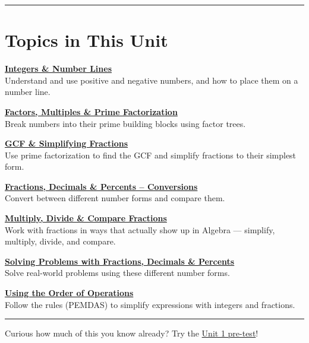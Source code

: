 \documentclass[
  letterpaper,
  DIV=11,
  numbers=noendperiod]{scrreprt}
\begin{document}
\begin{center}\rule{0.5\linewidth}{0.5pt}\end{center}

\section*{Topics in This Unit}\label{topics-in-this-unit}


\href{1.1_Integers_&_Number_Lines.html}{\textbf{Integers \& Number
Lines}}\\
Understand and use positive and negative numbers, and how to place them
on a number line.

\href{1.2_Factors_Multiples_&_Prime_Factorization.html}{\textbf{Factors,
Multiples \& Prime Factorization}}\\
Break numbers into their prime building blocks using factor trees.

\href{1.3_GCF_&_Simplifying_Fractions.html}{\textbf{GCF \& Simplifying
Fractions}}\\
Use prime factorization to find the GCF and simplify fractions to their
simplest form.

\href{1.4_Fractions_Decimals_&_Percents.html}{\textbf{Fractions,
Decimals \& Percents -- Conversions}}\\
Convert between different number forms and compare them.

\href{1.5_Multiply_Divide_&_Compare_Fractions.html}{\textbf{Multiply,
Divide \& Compare Fractions}}\\
Work with fractions in ways that actually show up in Algebra ---
simplify, multiply, divide, and compare.

\href{1.6_Solving_Problems_with_Fractions_Decimals_and_Percents.html}{\textbf{Solving
Problems with Fractions, Decimals \& Percents}}\\
Solve real-world problems using these different number forms.

\href{1.7_Order_of_Operations.html}{\textbf{Using the Order of
Operations}}\\
Follow the rules (PEMDAS) to simplify expressions with integers and
fractions.

\begin{center}\rule{0.5\linewidth}{0.5pt}\end{center}

Curious how much of this you know already? Try the
\href{./chapters/Supplemental/worksheets/Unit_1/pretest.pdf}{Unit 1
pre-test}!
\end{document}
